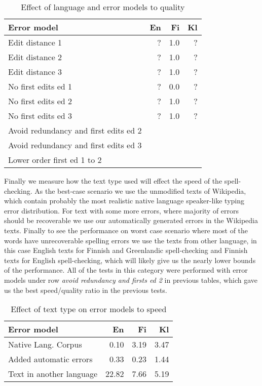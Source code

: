 \documentclass[11pt]{article}
\begin{document}
\begin{table}[h]
\begin{center}
\begin{scriptsize}
\begin{tabular}{|l|rrr|}
\hline
\bf Error model & \bf En & \bf Fi & \bf Kl\\ 
\hline
\hline
Edit distance 1 &
?&1.0&?
\\
Edit distance 2 &
?&1.0&?
\\
Edit distance 3 &
?&1.0&?
\\
No first edits ed 1 & 
?&0.0&?
\\
No first edits ed 2 &
?&1.0&?
\\
No first edits ed 3 &
?&1.0&?
\\
Avoid redundancy and first edits ed 2 &
\\
Avoid redundancy and first edits ed 3 &
\\
Lower order first ed 1 to 2 &
\\
\hline
\end{tabular}
\end{scriptsize}
\end{center}
\caption{\label{table:error-model-vs-language} Effect of language and 
error models to quality}
\end{table}

Finally we measure how the text type used will effect the speed of the
spell-checking. As the best-case scenario we use the unmodified texts of
Wikipedia, which contain probably the most realistic native language
speaker-like typing error distribution. For text with some more errors, where
majority of errors should be recoverable we use our automatically generated
errors in the Wikipedia texts. Finally to see the performance on worst case
scenario where most of the words have unrecoverable spelling errors we use the
texts from other language, in this case English texts for Finnish and 
Greenlandic spell-checking and Finnish texts for English spell-checking, which
will likely give us the nearly lower bounds of the performance. All of the
tests in this category were performed with error models under row
\emph{avoid redundancy and firsts ed 2} in previous tables, which gave us 
the best speed/quality ratio in the previous tests.

\begin{table}[h]
\begin{center}
\begin{scriptsize}
\begin{tabular}{|l|rrr|}
\hline
\bf Error model & \bf En & \bf Fi & \bf Kl  \\ 
\hline
Native Lang. Corpus &
0.10&3.19&3.47
\\
Added automatic errors &
0.33&0.23&1.44
\\
Text in another language &
22.82&7.66&5.19
\\
\hline
\end{tabular}
\end{scriptsize}
\end{center}
\caption{\label{table:language-vs-text-type} Effect of text type on
error models to speed}
\end{table}
\end{document}
